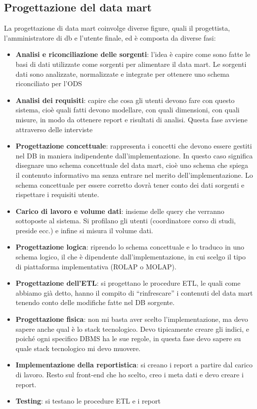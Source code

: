 \subsection{Progettazione del data mart}
La progettazione di data mart coinvolge diverse figure, quali il progettista, l’amministratore di db e l’utente finale, ed è composta da diverse fasi:
\begin{itemize}
	\item
	\textbf{Analisi e riconciliazione delle sorgenti}: l’idea è capire come sono fatte le basi di dati utilizzate come sorgenti per alimentare il data mart. Le sorgenti dati sono analizzate, normalizzate e integrate per ottenere uno schema riconciliato per l’ODS
	\item 
	\textbf{Analisi dei requisiti}: capire che cosa gli utenti devono fare con questo sistema, cioè quali fatti devono modellare, con quali dimensioni, con quali misure, in modo da ottenere report e risultati di analisi. Questa fase avviene attraverso delle interviste
	\item
	\textbf{Progettazione concettuale}: rappresenta i concetti che devono essere gestiti nel DB in maniera indipendente dall’implementazione. In questo caso significa disegnare uno schema concettuale del data mart, cioè uno schema che spiega il contenuto informativo ma senza entrare nel merito dell’implementazione. Lo schema concettuale per essere corretto dovrà tener conto dei dati sorgenti e rispettare i requisiti utente. 
	\item 
	\textbf{Carico di lavoro e volume dati}: insieme delle query che verranno sottoposte al sistema. Si profilano gli utenti (coordinatore corso di studi, preside ecc.) e infine si misura il volume dati.
	\item 
	\textbf{Progettazione logica}: riprendo lo schema concettuale e lo traduco in uno schema logico, il che è dipendente dall’implementazione, in cui scelgo il tipo di piattaforma implementativa (ROLAP o MOLAP). 
	\item 
	\textbf{Progettazione dell’ETL}: si progettano le procedure ETL, le quali come abbiamo già detto, hanno il compito di “rinfrescare” i contenuti del data mart tenendo conto delle modifiche fatte nel DB sorgente.
	\item
	\textbf{Progettazione fisica}: non mi basta aver scelto l’implementazione, ma devo sapere anche qual è lo stack tecnologico. Devo tipicamente creare gli indici, e poiché ogni specifico DBMS ha le sue regole, in questa fase devo sapere su quale stack tecnologico mi devo muovere.
	\item 
	\textbf{Implementazione della reportistica}: si creano i report a partire dal carico di lavoro. Resto sul front-end che ho scelto, creo i meta dati e devo creare i report. 
	\item 
	\textbf{Testing}: si testano le procedure ETL e i report
\end{itemize}
